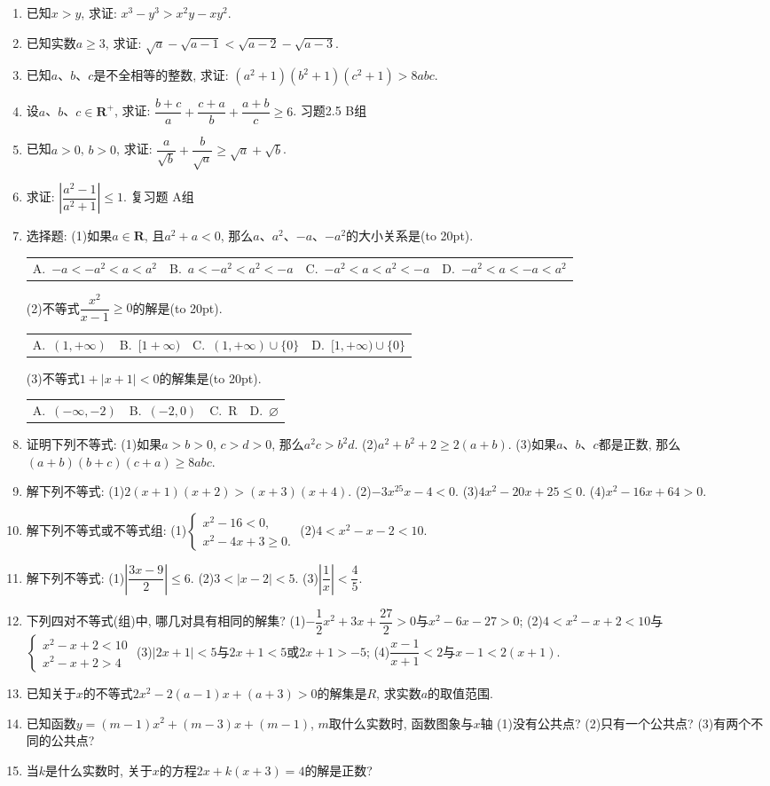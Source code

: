 \documentclass[10pt,a4paper]{article}
\newcommand{\bracket}[1]{(\hbox to #1pt{})}
\newcommand{\fourch}[4]{\par\begin{tabular}{p{.23\textwidth}p{.23\textwidth}p{.23\textwidth}p{.23\textwidth}}
A.~#1 &B.~#2& C.~#3& D.~#4
\end{tabular}}
\begin{document}
\begin{enumerate}[1.]
\item 已知$x>y$, 求证: $x^3-y^3>x^2y-xy^2$.
\item 已知实数$a\ge 3$, 求证: $\sqrt a-\sqrt {a-1}<\sqrt {a-2}-\sqrt {a-3}$.
\item 已知$a$、$b$、$c$是不全相等的整数, 求证: $(a^2+1)(b^2+1)(c^2+1)>8abc$.
\item 设$a$、$b$、$c\in \mathbf{R}^+$, 求证: $\dfrac{b+c}a+\dfrac{c+a}b+\dfrac{a+b}c\ge 6$.
习题2.5  B组
\item 已知$a>0$, $b>0$, 求证: $\dfrac a{\sqrt b}+\dfrac b{\sqrt a}\ge \sqrt a+\sqrt b$.
\item 求证: $|\dfrac{{a^2}-1}{{a^2}+1}|\le 1$.
复习题
A组
\item 选择题:
(1)如果$a\in \mathbf{R}$, 且$a^2+a<0$, 那么$a$、$a^2$、$-a$、$-a^2$的大小关系是\bracket{20}.
\fourch{$-a<-a^2<a<a^2$}{$a<-a^2<a^2<-a$}{$-a^2<a<a^2<-a$}{$-a^2<a<-a<a^2$}
(2)不等式$\dfrac{x^2}{x-1}\ge 0$的解是\bracket{20}.
\fourch{$(1,+\infty)$}{$[1+\infty)$}{$(1,+\infty)\cup \{0\}$}{$[1,+\infty)\cup \{0\}$}
(3)不等式$1+|x+1|<0$的解集是\bracket{20}.
\fourch{$(-\infty ,-2)$}{$(-2,0)$}{R}{$\varnothing$}
\item 证明下列不等式:
(1)如果$a>b>0$, $c>d>0$, 那么$a^2c>b^2d$.
(2)$a^2+b^2+2\ge 2(a+b)$.
(3)如果$a$、$b$、$c$都是正数, 那么$(a+b)(b+c)(c+a)\ge 8abc$.
\item 解下列不等式:
(1)$2(x+1)(x+2)>(x+3)(x+4)$.		(2)$-3x^25x-4<0$.
(3)$4x^2-20x+25\le 0$.					(4)$x^2-16x+64>0$.
\item 解下列不等式或不等式组:
(1)$\begin{cases} x^2-16<0, \\ x^2-4x+3\ge 0. \end{cases}$					(2)$4<x^2-x-2<10$.
\item 解下列不等式:
(1)$|\dfrac{3x-9}2|\le 6$.						(2)$3<|x-2|<5$.
(3)$|\dfrac 1x|<\dfrac 45$.
\item 下列四对不等式(组)中, 哪几对具有相同的解集?
(1)$-\dfrac 12x^2+3x+\dfrac{27}2>0$与$x^2-6x-27>0$;
(2)$4<x^2-x+2<10$与$\begin{cases} x^2-x+2<10 \\ x^2-x+2>4 \end{cases}$
(3)$|2x+1|<5$与$2x+1<5$或$2x+1>-5$;
(4)$\dfrac{x-1}{x+1}<2$与$x-1<2(x+1)$.
\item 已知关于$x$的不等式$2x^2-2(a-1)x+(a+3)>0$的解集是$R$, 求实数$a$的取值范围.
\item 已知函数$y=(m-1)x^2+(m-3)x+(m-1)$, $m$取什么实数时, 函数图象与$x$轴
(1)没有公共点?
(2)只有一个公共点?
(3)有两个不同的公共点?
\item 当$k$是什么实数时, 关于$x$的方程$2x+k(x+3)=4$的解是正数?

\end{enumerate}
\end{document}
